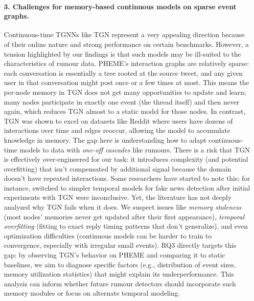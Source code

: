 \documentclass{cshonours}
\begin{document}
\paragraph{3. Challenges for memory-based continuous models on sparse event graphs.} Continuous-time TGNNs like TGN represent a very appealing direction because of their online nature and strong performance on certain benchmarks. However, a tension highlighted by our findings is that such models may be ill-suited to the characteristics of rumour data. PHEME’s interaction graphs are relatively sparse: each conversation is essentially a tree rooted at the source tweet, and any given user in that conversation might post once or a few times at most. This means the per-node memory in TGN does not get many opportunities to update and learn; many nodes participate in exactly one event (the thread itself) and then never again, which reduces TGN almost to a static model for those nodes. In contrast, TGN was shown to excel on datasets like Reddit where users have dozens of interactions over time and edges reoccur, allowing the model to accumulate knowledge in memory. The gap here is understanding how to adapt continuous-time models to data with \emph{one-off cascades} like rumours. There is a risk that TGN is effectively over-engineered for our task: it introduces complexity (and potential overfitting) that isn’t compensated by additional signal because the domain doesn’t have repeated interactions. Some researchers have started to note this; for instance, \cite{song2021dynamic} switched to simpler temporal models for fake news detection after initial experiments with TGN were inconclusive. Yet, the literature has not deeply analyzed why TGN fails when it does. We suspect issues like \emph{memory staleness} (most nodes’ memories never get updated after their first appearance), \emph{temporal overfitting} (fitting to exact reply timing patterns that don’t generalize), and even optimization difficulties (continuous models can be harder to train to convergence, especially with irregular small events). RQ3 directly targets this gap: by observing TGN’s behavior on PHEME and comparing it to static baselines, we aim to diagnose specific factors (e.g., distribution of event sizes, memory utilization statistics) that might explain its underperformance. This analysis can inform whether future rumour detectors should incorporate such memory modules or focus on alternate temporal modeling.
\end{document}
